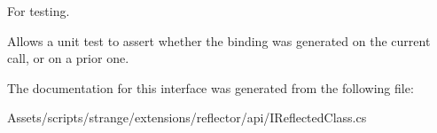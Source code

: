 For testing. 

Allows a unit test to assert whether the binding was generated on the current call, or on a prior one. 

The documentation for this interface was generated from the following file\-:\begin{DoxyCompactItemize}
\item 
Assets/scripts/strange/extensions/reflector/api/I\-Reflected\-Class.\-cs\end{DoxyCompactItemize}
